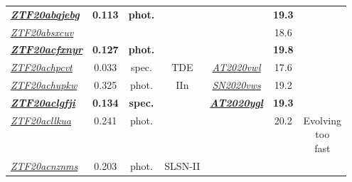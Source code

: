 \begin{table*}
\begin{tabular}{l  c  c  c   c  c  c}
    \textbf{\textit{\href{https://ztfnuclear.simeonreusch.com/transient/ZTF20abqjebg}{ZTF20abqjebg}}} & \textbf{0.113} & \textbf{phot.} & ~                       & ~                 & \textbf{19.3}              &                      \\
    \textit{\href{https://ztfnuclear.simeonreusch.com/transient/ZTF20absxcuv}{ZTF20absxcuv}}          & ~              & ~              & ~                       & ~                 & 18.6                       &                      \\
    \textbf{\textit{\href{https://ztfnuclear.simeonreusch.com/transient/ZTF20acfxnyr}{ZTF20acfxnyr}}} & \textbf{0.127} & \textbf{phot.} & ~                       & ~                 & \textbf{19.8}              &                      \\
    \textit{\href{https://ztfnuclear.simeonreusch.com/transient/ZTF20achpcvt}{ZTF20achpcvt}}          & 0.033          & spec.          & TDE                     &
    \textit{\href{https://www.wis-tns.org/object/2020vwl}{AT2020vwl}}                                 & 17.6           &                                                                                                                  \\
    \textit{\href{https://ztfnuclear.simeonreusch.com/transient/ZTF20achupkw}{ZTF20achupkw}}          & 0.325          & phot.          & IIn                     &
    \textit{\href{https://www.wis-tns.org/object/2020vws}{SN2020vws}}                                 & 19.2           &                                                                                                                  \\
    \textbf{\textit{\href{https://ztfnuclear.simeonreusch.com/transient/ZTF20aclgfji}{ZTF20aclgfji}}} & \textbf{0.134} & \textbf{spec.} & ~                       &
    \textbf{\textit{\href{https://www.wis-tns.org/object/2020ygl}{AT2020ygl}}}                        & \textbf{19.3}  &                                                                                                                  \\
    \textit{\href{https://ztfnuclear.simeonreusch.com/transient/ZTF20acllkua}{ZTF20acllkua}}          & 0.241          & phot.          & ~                       & ~                 & 20.2                       & \makecell{Evolving   \\too\\ fast}    \\
    \textit{\href{https://ztfnuclear.simeonreusch.com/transient/ZTF20acnznms}{ZTF20acnznms}}          & 0.203          & phot.          & SLSN-II                 &

\end{tabular}
\end{table*}
